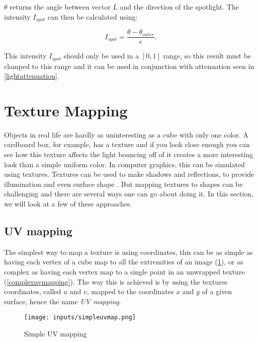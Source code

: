 \documentclass[cic,tc,english]{iiufrgs}
\begin{document}
$\theta$ returns the angle between vector $L$ and the direction of the spotlight. The intensity $I_{spot}$ can then be calculated using: 

\begin{equation}
    I_{spot} = \frac{\theta - \theta_{outer}}{\epsilon}.
    \label{lightspot}
\end{equation}

This intensity $I_{spot}$ should only be used in a $[0,1]$ range, so this result must be clamped to this range and it can be used in conjunction with attenuation seen in \cref{lightattenuation}.

\section{Texture Mapping}
\label{texturemappingsection}
Objects in real life are hardly as uninteresting as a cube with only one color. A cardboard box, for example, has a texture and if you look close enough you can see how this texture affects the light bouncing off of it creates a more interesting look than a simple uniform color. In computer graphics, this can be simulated using textures. Textures can be used to make shadows and reflections, to provide illumination and even surface shape \cite{Marschner2021CGFundamentals}.  But mapping textures to shapes can be challenging and there are several ways one can go about doing it. In this section, we will look at a few of these approaches.

\subsection{UV mapping}
The simplest way to map a texture is using coordinates, this can be as simple as having each vertex of a cube map to all the extremities of an image (\cref{simpleuvmapping}), or as complex as having each vertex map to a single point in an unwrapped texture (\cref{complexuvmapping}). The way this is achieved is by using the textures coordinates, called $u$ and $v$, mapped to the coordinates $x$ and $y$ of a given surface, hence the name \textit{UV mapping}.

\begin{figure}[h!]
    \caption{Simple UV mapping}
    \begin{center}
        \texttt{[image: inputs/simpleuvmap.png]}
    \end{center}
    \label{simpleuvmapping}
\end{figure}
\end{document}
